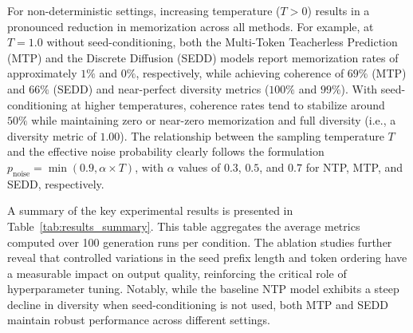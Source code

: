 \documentclass[11pt]{article}
\begin{document}
For non-deterministic settings, increasing temperature (\(T>0\)) results in a pronounced reduction in memorization across all methods. For example, at \(T=1.0\) without seed-conditioning, both the Multi-Token Teacherless Prediction (MTP) and the Discrete Diffusion (SEDD) models report memorization rates of approximately \(1\%\) and \(0\%\), respectively, while achieving coherence of \(69\%\) (MTP) and \(66\%\) (SEDD) and near-perfect diversity metrics (\(100\%\) and \(99\%\)). With seed-conditioning at higher temperatures, coherence rates tend to stabilize around \(50\%\) while maintaining zero or near-zero memorization and full diversity (i.e., a diversity metric of \(1.00\)). The relationship between the sampling temperature \(T\) and the effective noise probability clearly follows the formulation \(p_{\text{noise}} = \min(0.9, \alpha \times T)\), with \(\alpha\) values of \(0.3\), \(0.5\), and \(0.7\) for NTP, MTP, and SEDD, respectively.

A summary of the key experimental results is presented in Table~\ref{tab:results_summary}. This table aggregates the average metrics computed over 100 generation runs per condition. The ablation studies further reveal that controlled variations in the seed prefix length and token ordering have a measurable impact on output quality, reinforcing the critical role of hyperparameter tuning. Notably, while the baseline NTP model exhibits a steep decline in diversity when seed-conditioning is not used, both MTP and SEDD maintain robust performance across different settings.
\end{document}
